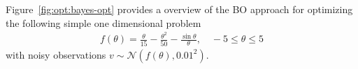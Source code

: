 Figure~\ref{fig:opt:bayes-opt} provides a overview of the BO approach for optimizing the 
following simple one dimensional problem
\begin{align}
\label{eq:opt:toy}
f(\theta) = \frac{\theta}{15}-\frac{\theta^2}{50}-\frac{\sin \theta}{\theta}, \quad -5\le \theta \le 5
\end{align}
with noisy observations $v\sim\mathcal{N}(f(\theta),0.01^2)$.
